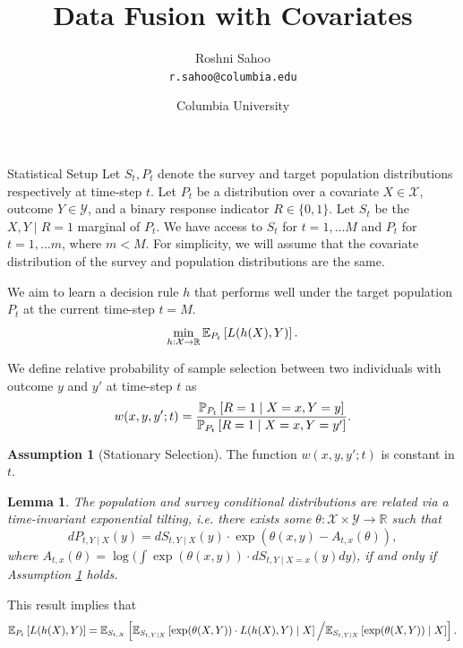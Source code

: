 \documentclass{article}
\author{Roshni Sahoo\\
  \texttt{r.sahoo@columbia.edu}}
\title{Data Fusion with Covariates}
\date{Columbia University}
\theoremstyle{definition}
\newtheorem{assumption}{Assumption}
\theoremstyle{plain}
\newtheorem{lemm}[prop]{Lemma}
\theoremstyle{remark}
\begin{document}
\maketitle


\begin{section}{Statistical Setup}
Let $S_{t}, P_{t}$ denote the survey and target population distributions respectively at time-step $t.$ Let $P_{t}$ be a distribution over a covariate $X \in \mathcal{X}$, outcome $Y \in \mathcal{Y}$, and a binary response indicator $R \in \{0, 1\}.$ Let $S_{t}$ be the $X, Y \mid R=1$ marginal of $P_{t}$. We have access to $S_{t}$ for $t=1, \dots M$ and $P_{t}$ for $t=1, \dots m$, where $m < M$. For simplicity, we will assume that the covariate distribution of the survey and population distributions are the same.

We aim to learn a decision rule $h$ that performs well under the target population $P_{t}$ at the current time-step $t=M.$
\[ \min_{h: \mathcal{X} \rightarrow \mathbb{R}} \EE[P_{t}]{L(h(X), Y)}.\]

We define relative probability of sample selection between two individuals with outcome $y$ and $y'$ at time-step $t$ as 
\begin{equation} w(x, y, y'; t) = \frac{\PP[P_{t}]{R=1 \mid X=x, Y=y}}{\PP[P_{t}]{R=1 \mid X=x, Y= y'}}.\end{equation}


\begin{assumption}[Stationary Selection]
\label{assumption:stationary_selection}
The function $w(x, y, y'; t)$ is constant in $t$.
\end{assumption}

\begin{lemm}
\label{lemm:equivalence}
The population and survey conditional distributions are related via a time-invariant exponential tilting, i.e. there exists some $\theta: \mathcal{X} \times \mathcal{Y} \rightarrow \mathbb{R}$ such that
\[dP_{t, Y \mid X}(y) = dS_{t, Y \mid X}(y) \cdot \exp(\theta(x, y) - A_{t, x}(\theta)),\] 
where $A_{t, x}(\theta) = \log\Big( \int \exp(\theta(x, y)) \cdot dS_{t, Y \mid X=x}(y) dy\Big)$, if and only if Assumption \ref{assumption:stationary_selection} holds.
\end{lemm}

This result implies that 
\[ \EE[P_{t}]{L(h(X), Y)} = \EE[S_{t, X}]{\EE[S_{t, Y\mid X}]{\exp(\theta(X, Y)) \cdot L(h(X), Y) \mid X} \Big/ \EE[S_{t, Y \mid X}]{\exp(\theta(X, Y)) \mid X}}.\]
\end{section}
\end{document}
